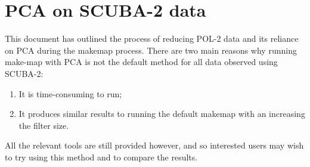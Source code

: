 \chapter{PCA on SCUBA-2 data}
\label{app:pca}

This document has outlined the process of reducing POL-2 data and its
reliance on PCA during the makemap process. There are two main reasons 
why running make-map with PCA is not the default method for all data observed
using SCUBA-2:

\begin{enumerate}
\item It is time-consuming to run;
\item It produces similar results to running the default makemap with an increasing the filter size.
\end{enumerate}

All the relevant tools are still provided however, and so interested users
may wish to try using this method and to compare the results.
